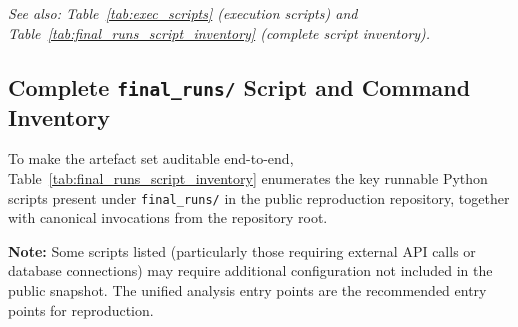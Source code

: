 \noindent\textit{See also: Table~\ref{tab:exec_scripts} (execution scripts) and Table~\ref{tab:final_runs_script_inventory} (complete script inventory).}

\subsection{Complete \texttt{final\_runs/} Script and Command Inventory}
\label{sec:final_runs_script_inventory}

To make the artefact set auditable end-to-end, Table~\ref{tab:final_runs_script_inventory} enumerates the key runnable Python scripts present under \texttt{final\_runs/} in the public reproduction repository, together with canonical invocations from the repository root.

\noindent\textbf{Note:} Some scripts listed (particularly those requiring external API calls or database connections) may require additional configuration not included in the public snapshot. The unified analysis entry points are the recommended entry points for reproduction.


